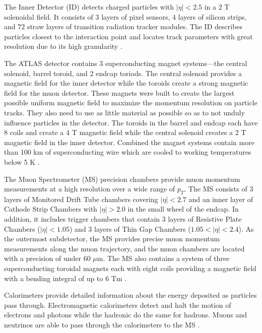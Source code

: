 The Inner Detector (ID) detects charged particles with $|\eta| < 2.5$ in a 2 T solenoidal field. It consists of $3$ layers of pixel sensors, $4$ layers of silicon strips, and $72$ straw layers of transition radiation tracker modules. The ID describes particles closest to the interaction point and locates track parameters with great resolution due to its high granularity \cite{detector}. 

The ATLAS detector contains 3 superconducting magnet systems---the central solenoid, barrel toroid, and 2 endcap toriods. The central solenoid provides a magnetic field for the inner detector while the toroids create a strong magnetic field for the muon detector. These magnets were built to create the largest possible uniform magnetic field to maximize the momentum resolution on particle tracks. They also need to use as little material as possible so as to not unduly influence particles in the detector. The toroids in the barrel and endcap each have 8 coils and create a 4 T magnetic field while the central solenoid creates a 2 T magnetic field in the inner detector. Combined the magnet systems contain more than 100 km of superconducting wire which are cooled to working temperatures below 5 K \cite{detector}. 

The Muon Spectrometer (MS) precision chambers provide muon momentum measurements at a high resolution over a wide range of $p_T$. The MS consists of $3$ layers of Monitored Drift Tube chambers covering $|\eta| < 2.7$ and an inner layer of Cathode Strip Chambers with $|\eta| > 2.0$ in the small wheel of the endcap. In addition, it includes trigger chambers that contain $3$ layers of Resistive Plate Chambers ($|\eta| < 1.05$) and $3$ layers of Thin Gap Chambers ($1.05 < |\eta| < 2.4$). As the outermost subdetector, the MS provides precise muon momentum measurements along the muon trajectory, and the muon chambers are located with a precision of under $60$ $\mu$m. The MS also contains a system of three superconducting toroidal magnets each with eight coils providing a magnetic field with a bending integral of up to $6$ Tm \cite{detector}. 

Calorimeters provide detailed information about the energy deposited as particles pass through. Electromagnetic calorimeters detect and halt the motion of electrons and photons while the hadronic do the same for hadrons. Muons and neutrinos are able to pass through the calorimeters to the MS \cite{detector}. 

